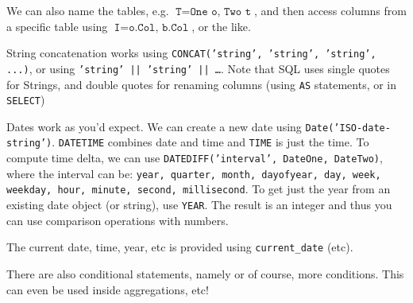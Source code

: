 We can also name the tables, e.g. $\texttt{T} = \texttt{One o, Two t}$, and then access columns from a specific table using
$\texttt{I} = \texttt{o.Col, b.Col}$, or the like.

String concatenation works using \texttt{CONCAT('string', 'string', 'string', ...)}, or using \texttt{'string' || 'string' || \dots}.
Note that SQL uses single quotes for Strings, and double quotes for renaming columns (using \texttt{AS} statements, or in \texttt{SELECT})

Dates work as you'd expect. We can create a new date using \texttt{Date('ISO-date-string')}. \texttt{DATETIME} combines date and time and \texttt{TIME} is just the time.
To compute time delta, we can use \texttt{DATEDIFF('interval', DateOne, DateTwo)}, where the interval can be:
\texttt{year, quarter, month, dayofyear, day, week, weekday, hour, minute, second, millisecond}.
To get just the year from an existing date object (or string), use \texttt{YEAR}. The result is an integer and thus you can use comparison operations with numbers.

The current date, time, year, etc is provided using \texttt{current\_date} (etc).

There are also conditional statements, namely
or of course, more conditions. This can even be used inside aggregations, etc!
